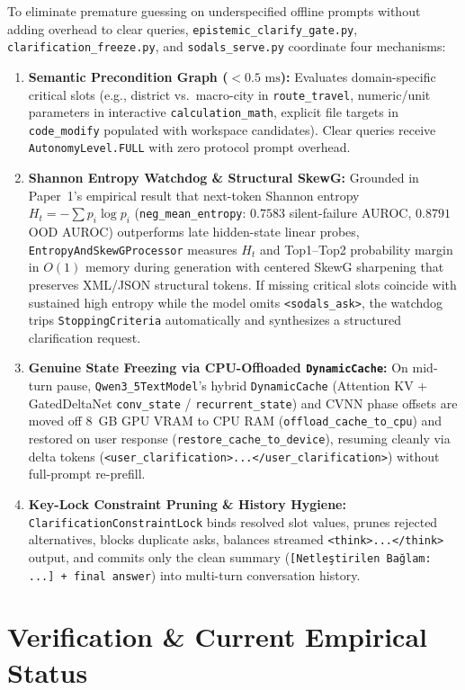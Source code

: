 \documentclass[11pt,a4paper]{article}
\begin{document}
To eliminate premature guessing on underspecified offline prompts without adding overhead to clear queries, \texttt{epistemic\_clarify\_gate.py}, \texttt{clarification\_freeze.py}, and \texttt{sodals\_serve.py} coordinate four mechanisms:
\begin{enumerate}[leftmargin=1.5em]
    \item \textbf{Semantic Precondition Graph ($<0.5\text{ ms}$):} Evaluates domain-specific critical slots (e.g., district vs.\ macro-city in \texttt{route\_travel}, numeric/unit parameters in interactive \texttt{calculation\_math}, explicit file targets in \texttt{code\_modify} populated with workspace candidates). Clear queries receive \texttt{AutonomyLevel.FULL} with zero protocol prompt overhead.
    \item \textbf{Shannon Entropy Watchdog \& Structural SkewG:} Grounded in Paper~1's empirical result that next-token Shannon entropy $H_t = -\sum p_i \log p_i$ (\texttt{neg\_mean\_entropy}: $0.7583$ silent-failure AUROC, $0.8791$ OOD AUROC) outperforms late hidden-state linear probes, \texttt{EntropyAndSkewGProcessor} measures $H_t$ and Top1--Top2 probability margin in $O(1)$ memory during generation with centered SkewG sharpening that preserves XML/JSON structural tokens. If missing critical slots coincide with sustained high entropy while the model omits \texttt{<sodals\_ask>}, the watchdog trips \texttt{StoppingCriteria} automatically and synthesizes a structured clarification request.
    \item \textbf{Genuine State Freezing via CPU-Offloaded \texttt{DynamicCache}:} On mid-turn pause, \texttt{Qwen3\_5TextModel}'s hybrid \texttt{DynamicCache} (Attention KV + GatedDeltaNet \texttt{conv\_state} / \texttt{recurrent\_state}) and CVNN phase offsets are moved off 8~GB GPU VRAM to CPU RAM (\texttt{offload\_cache\_to\_cpu}) and restored on user response (\texttt{restore\_cache\_to\_device}), resuming cleanly via delta tokens (\texttt{<user\_clarification>...</user\_clarification>}) without full-prompt re-prefill.
    \item \textbf{Key-Lock Constraint Pruning \& History Hygiene:} \texttt{ClarificationConstraintLock} binds resolved slot values, prunes rejected alternatives, blocks duplicate asks, balances streamed \texttt{<think>...</think>} output, and commits only the clean summary (\texttt{[Netle\c{s}tirilen Ba\u{g}lam: ...] + final answer}) into multi-turn conversation history.
\end{enumerate}

\section{Verification \& Current Empirical Status}
\end{document}
